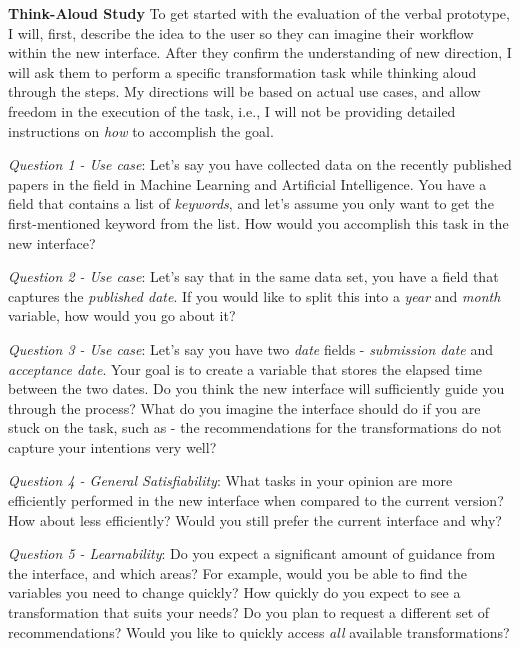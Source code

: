 \documentclass[12pt,letterpaper]{article}
\begin{document}
\textbf{Think-Aloud Study}
To get started with the evaluation of the verbal prototype, I will, first, describe the idea to the user so they can imagine their workflow within the new interface. After they confirm the understanding of new direction, I will ask them to perform a specific transformation task while thinking aloud through the steps. My directions will be based on actual use cases, and allow freedom in the execution of the task, i.e., I will not be providing detailed instructions on \textit{how} to accomplish the goal.

\textit{Question 1 - Use case}: Let's say you have collected data on the recently published papers in the field in Machine Learning and Artificial Intelligence. You have a field that contains a list of \textit{keywords}, and let's assume you only want to get the first-mentioned keyword from the list. How would you accomplish this task in the new interface?  

\textit{Question 2 - Use case}: Let's say that in the same data set, you have a field that captures the \textit{published date}. If you would like to split this into a \textit{year} and \textit{month} variable, how would you go about it?

\textit{Question 3 - Use case}: Let's say you have two \textit{date} fields - \textit{submission date} and \textit{acceptance date}. Your goal is to create a variable that stores the elapsed time between the two dates. Do you think the new interface will sufficiently guide you through the process? What do you imagine the interface should do if you are stuck on the task, such as - the recommendations for the transformations do not capture your intentions very well?   

\textit{Question 4 - General Satisfiability}: What tasks in your opinion are more efficiently performed in the new interface when compared to the current version? How about less efficiently? Would you still prefer the current interface and why? 

\textit{Question 5 - Learnability}: Do you expect a significant amount of guidance from the interface, and which areas? For example, would you be able to find the variables you need to change quickly? How quickly do you expect to see a transformation that suits your needs? Do you plan to request a different set of recommendations? Would you like to quickly access \textit{all} available transformations? 
\end{document}
